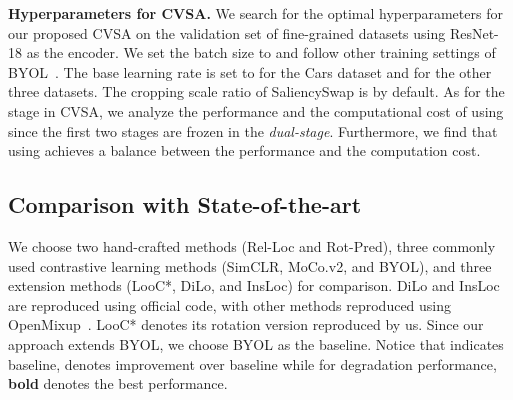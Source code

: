 \textbf{Hyperparameters for CVSA.}\quad
We search for the optimal hyperparameters for our proposed CVSA on the validation set of fine-grained datasets using ResNet-18 as the encoder. We set the batch size to  and follow other training settings of BYOL~\cite{nips2020byol}. The base learning rate is set to  for the Cars dataset and  for the other three datasets. The cropping scale ratio of SaliencySwap is  by default. As for the stage  in CVSA, we analyze the performance and the computational cost of using  since the first two stages are frozen in the \textit{dual-stage}. Furthermore, we find that using  achieves a balance between the performance and the computation cost.

\subsection{Comparison with State-of-the-art}
We choose two hand-crafted methods (Rel-Loc and Rot-Pred), three commonly used contrastive learning methods (SimCLR, MoCo.v2, and BYOL), and three extension methods (LooC*, DiLo, and InsLoc) for comparison. DiLo and InsLoc are reproduced using official code, with other methods reproduced using OpenMixup~\cite{li2022openmixup}. LooC* denotes its rotation version reproduced by us. Since our approach extends BYOL, we choose BYOL as the baseline. Notice that  indicates baseline,  denotes improvement over baseline while  for degradation performance, \textbf{bold} denotes the best performance.

